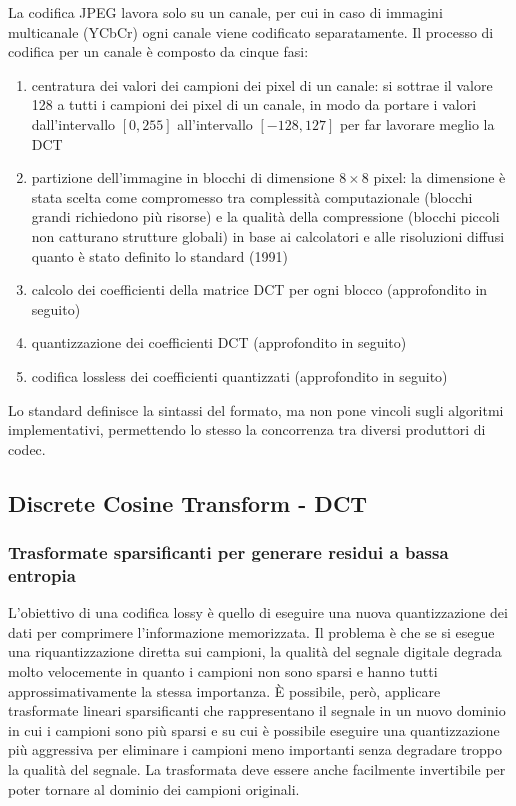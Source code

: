 La codifica JPEG lavora solo su un canale, per cui in caso di immagini multicanale (YCbCr) ogni canale viene codificato
separatamente. Il processo di codifica per un canale è composto da cinque fasi:
\begin{enumerate}
	\item centratura dei valori dei campioni dei pixel di un canale: si sottrae il valore 128 a tutti i campioni dei
	pixel di un canale, in modo da portare i valori dall'intervallo \([0, 255]\) all'intervallo \([-128, 127]\) per
	far lavorare meglio la DCT
	\item partizione dell'immagine in blocchi di dimensione \(8 \times 8\) pixel: la dimensione è stata scelta come
	compromesso tra complessità computazionale (blocchi grandi richiedono più risorse) e la qualità della compressione
	(blocchi piccoli non catturano strutture globali) in base ai calcolatori e alle risoluzioni diffusi quanto è stato
	definito lo standard (1991)
	\item calcolo dei coefficienti della matrice DCT per ogni blocco (approfondito in seguito)
	\item quantizzazione dei coefficienti DCT (approfondito in seguito)
	\item codifica lossless dei coefficienti quantizzati (approfondito in seguito)
\end{enumerate}

\noindent
Lo standard definisce la sintassi del formato, ma non pone vincoli sugli algoritmi implementativi, permettendo
lo stesso la concorrenza tra diversi produttori di codec.

\subsection{Discrete Cosine Transform - DCT}
\subsubsection*{Trasformate sparsificanti per generare residui a bassa entropia}
L'obiettivo di una codifica lossy è quello di eseguire una nuova quantizzazione dei dati per comprimere l'informazione
memorizzata. Il problema è che se si esegue una riquantizzazione diretta sui campioni, la qualità del segnale digitale
degrada molto velocemente in quanto i campioni non sono sparsi e hanno tutti approssimativamente la stessa importanza.
È possibile, però, applicare trasformate lineari sparsificanti che rappresentano il segnale in un nuovo dominio in cui
i campioni sono più sparsi e su cui è possibile eseguire una quantizzazione più aggressiva per eliminare i campioni meno
importanti senza degradare troppo la qualità del segnale. La trasformata deve essere anche facilmente invertibile per
poter tornare al dominio dei campioni originali.

